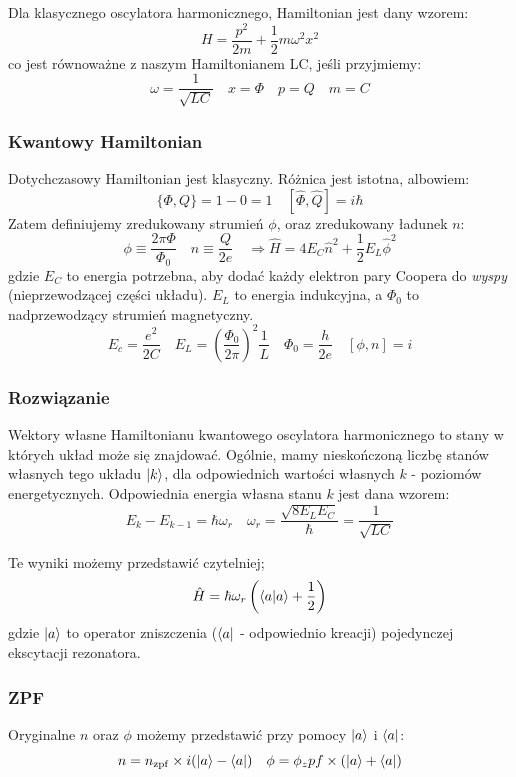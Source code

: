 \documentclass{../notatki}
\newcommand{\zpf}{\mathrm{zpf}}
\begin{document}
Dla klasycznego oscylatora harmonicznego, Hamiltonian jest dany wzorem:
$$
H = \frac{p^2}{2m} + \frac{1}{2} m \omega^2 x^2
$$
co jest równoważne z naszym Hamiltonianem LC, jeśli przyjmiemy:
$$
\omega = \frac{1}{\sqrt{LC}} \quad x = \Phi \quad p = Q \quad m = C
$$

\subsubsection{Kwantowy Hamiltonian}

Dotychczasowy Hamiltonian jest klasyczny. Różnica jest istotna, albowiem:
$$
\{\Phi, Q\} = 1 - 0 = 1 \quad [\hat{\Phi}, \hat{Q}] = i \hbar
$$
Zatem definiujemy zredukowany strumień $\phi$, oraz zredukowany ładunek $n$:
$$
\phi \equiv \frac{2\pi\Phi}{\Phi_0} \quad n \equiv \frac{Q}{2e} \quad
\Rightarrow \hat{H} = 4 E_C \hat{n}^2 + \frac{1}{2} E_L \hat{\phi}^2
$$
gdzie $E_C$ to energia potrzebna, aby dodać każdy
elektron pary Coopera
do \textit{wyspy} (nieprzewodzącej części układu). $E_L$ to energia
indukcyjna, a $\Phi_0$ to nadprzewodzący strumień magnetyczny.
$$
E_c = \frac{e^2}{2C} \quad E_L = \left(\frac{\Phi_0}{2\pi}\right)^2
\frac{1}{L} \quad \Phi_0 = \frac{h}{2e} \quad [\phi, n] = i
$$

\subsubsection{Rozwiązanie}

Wektory własne Hamiltonianu kwantowego oscylatora harmonicznego to stany w
których układ może się znajdować. Ogólnie, mamy nieskończoną liczbę stanów
własnych tego układu $\ket{k}$, dla odpowiednich wartości własnych
$k$ - poziomów energetycznych. Odpowiednia energia własna stanu $k$ jest dana
wzorem:
$$
E_k - E_{k - 1} = \hbar \omega_r \quad \omega_r =
\frac{\sqrt{8E_LE_C}}{\hbar} = \frac{1}{\sqrt{LC}}
$$

Te wyniki możemy przedstawić czytelniej;
$$
\hat{H} = \hbar \omega_r \left(\bra{a}\ket{a} + \frac{1}{2}\right)
$$
gdzie $\ket{a}$ to operator zniszczenia ($\bra{a}$ - odpowiednio
kreacji) pojedynczej ekscytacji rezonatora.

\subsubsection{ZPF}

Oryginalne $n$ oraz $\phi$ możemy przedstawić przy pomocy $\ket{a}$ i $\bra{a}$:
$$
n = n_\zpf \times i (\ket{a} - \bra{a}) \quad \phi = \phi_zpf \times
(\ket{a} + \bra{a})
$$
\end{document}
